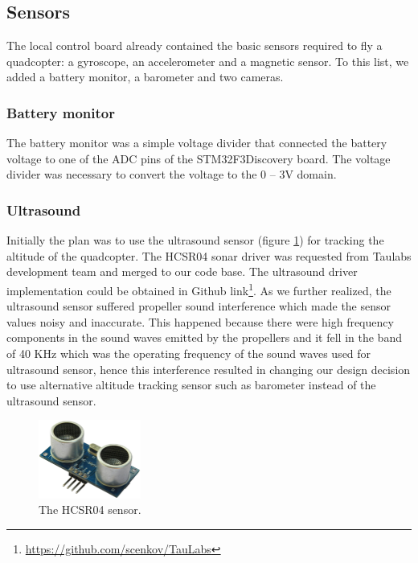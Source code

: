 \documentclass[11pt, a4paper, onecolumn, oneside, parskip=half]{scrartcl}
\begin{document}
\subsection{Sensors}
\label{sec:arch:sensors}
The local control board already contained the basic sensors required to fly a quadcopter: a gyroscope, an accelerometer and a magnetic sensor. To this list, we added a battery monitor, a barometer and two cameras.

\subsubsection{Battery monitor}
\label{sec:arch:sensors:battery}
The battery monitor was a simple voltage divider that connected the battery voltage to one of the ADC pins of the STM32F3Discovery board. The voltage divider was necessary to convert the voltage to the 0 -- 3V domain.

\subsubsection{Ultrasound}
\label{sec:arch:sensors:ultrasound}
Initially the plan was to use the ultrasound sensor (figure \ref{fig:hcsr04}) for tracking the altitude of the quadcopter. The HCSR04 sonar driver was requested from Taulabs development team and merged to our code base. The ultrasound driver implementation could be obtained in Github link\footnote{\url{https://github.com/scenkov/TauLabs}}. As we further realized, the ultrasound sensor suffered propeller sound interference which made the sensor values noisy and inaccurate. This happened because there were high frequency components in the sound waves emitted by the propellers and it fell in the band of 40 KHz which was the operating frequency of the sound waves used for ultrasound sensor, hence this interference resulted in changing our design decision to use alternative altitude tracking sensor such as barometer instead of the ultrasound sensor.

\begin{figure}[ht]
\centering
\includegraphics[width=0.3\textwidth]{HC-SR04}
\caption{The HCSR04 sensor.}
\label{fig:hcsr04}
\end{figure}
\end{document}
